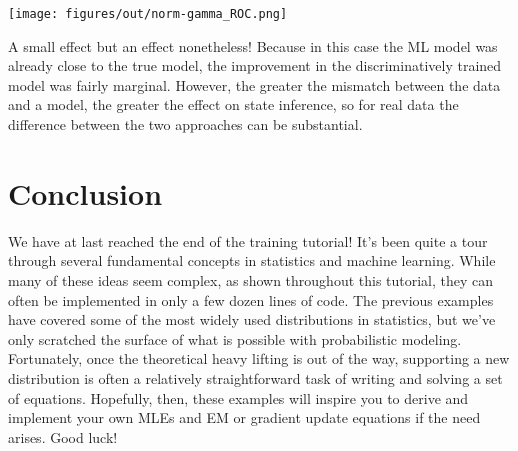 \begin{NotebookImage}
\texttt{[image: figures/out/norm-gamma\_ROC.png]}
\end{NotebookImage}

A small effect but an effect nonetheless! Because in this case the ML model was already close to the true model, the improvement in the discriminatively trained model was fairly marginal. However, the greater the mismatch between the data and a model, the greater the effect on state inference, so for real data the difference between the two approaches can be substantial.

\section{Conclusion}

We have at last reached the end of the training tutorial! It's been quite a tour through several fundamental concepts in statistics and machine learning. While many of these ideas seem complex, as shown throughout this tutorial, they can often be implemented in only a few dozen lines of code. The previous examples have covered some of the most widely used distributions in statistics, but we've only scratched the surface of what is possible with probabilistic modeling. Fortunately, once the theoretical heavy lifting is out of the way, supporting a new distribution is often a relatively straightforward task of writing and solving a set of equations. Hopefully, then, these examples will inspire you to derive and implement your own MLEs and EM or gradient update equations if the need arises. Good luck!
